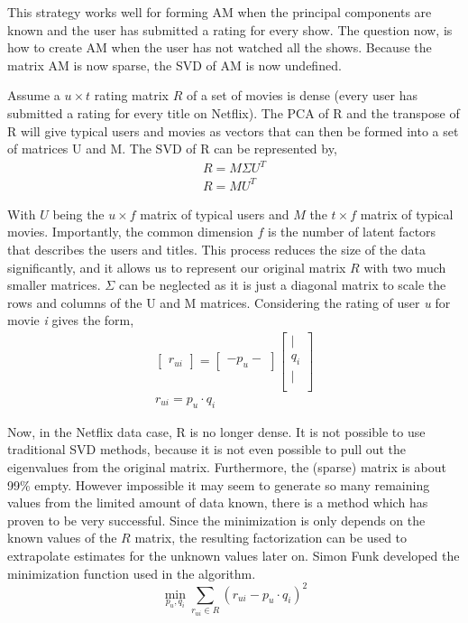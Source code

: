 \documentclass[11pt,a4paper]{article}
\begin{document}
This strategy works well for forming AM when the principal components are known and the user has submitted a rating for every show. The question now, is how to create AM when the user has not watched all the shows. Because the matrix AM is now sparse, the SVD of AM is now undefined.

Assume a $u \times t$ rating matrix $R$ of a set of movies is dense (every user has submitted a rating for every title on Netflix). The PCA of R and the transpose of R will give typical users and movies as vectors that can then be formed into a set of matrices U and M. The SVD of R can be represented by,
\begin{align*}
    R = M\Sigma U^T \\
    R = M U^T
\end{align*}

With $U$ being the $u \times f$ matrix of typical users and $M$ the $t \times f$ matrix of typical movies. Importantly, the common dimension $f$ is the number of latent factors that describes the users and titles. This process reduces the size of the data significantly, and it allows us to represent our original matrix $R$ with two much smaller matrices. $\Sigma$ can be neglected as it is just a diagonal matrix to scale the rows and columns of the U and M matrices. Considering the rating of user \textit{u} for movie \textit{i} gives the form,
\begin{align*}
    \begin{bmatrix}
        r_{ui}
    \end{bmatrix}
    =
    \begin{bmatrix}
        - p_\textit{u} -
    \end{bmatrix}
    \begin{bmatrix}
        |            \\
        q_\textit{i} \\
        |            \\
    \end{bmatrix}
    \\
    r_{ui} = p_u \cdot q_i
\end{align*}

Now, in the Netflix data case, R is no longer dense. It is not possible to use traditional SVD methods, because it is not even possible to pull out the eigenvalues from the original matrix. Furthermore, the (sparse) matrix is about 99\% empty. However impossible it may seem to generate so many remaining values from the limited amount of data known, there is a method which has proven to be very successful. Since the minimization is only depends on the known values of the $R$ matrix, the resulting factorization can be used to extrapolate estimates for the unknown values later on. Simon Funk developed the minimization function used in the algorithm.
\begin{equation}
    \min_{p_u,q_i} \sum_{r_{ui} \in R} (r_{ui} - p_u \cdot q_i)^2
\end{equation}
\end{document}
